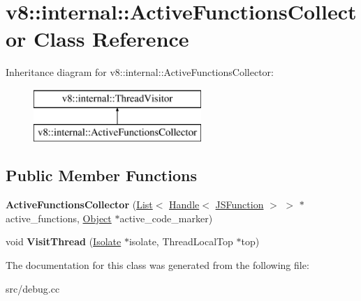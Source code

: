 \hypertarget{classv8_1_1internal_1_1_active_functions_collector}{}\section{v8\+:\+:internal\+:\+:Active\+Functions\+Collector Class Reference}
\label{classv8_1_1internal_1_1_active_functions_collector}
Inheritance diagram for v8\+:\+:internal\+:\+:Active\+Functions\+Collector\+:\begin{figure}[H]
\begin{center}
\leavevmode
\includegraphics[height=2.000000cm]{classv8_1_1internal_1_1_active_functions_collector}
\end{center}
\end{figure}
\subsection*{Public Member Functions}
\begin{DoxyCompactItemize}
\item 
\hypertarget{classv8_1_1internal_1_1_active_functions_collector_a331bc8ac57fd311da9df7ac111166fb7}{}{\bfseries Active\+Functions\+Collector} (\hyperlink{classv8_1_1internal_1_1_list}{List}$<$ \hyperlink{classv8_1_1internal_1_1_handle}{Handle}$<$ \hyperlink{classv8_1_1internal_1_1_j_s_function}{J\+S\+Function} $>$ $>$ $\ast$active\+\_\+functions, \hyperlink{classv8_1_1internal_1_1_object}{Object} $\ast$active\+\_\+code\+\_\+marker)\label{classv8_1_1internal_1_1_active_functions_collector_a331bc8ac57fd311da9df7ac111166fb7}

\item 
\hypertarget{classv8_1_1internal_1_1_active_functions_collector_ab963c00d3974baab41b31cf969da76a7}{}void {\bfseries Visit\+Thread} (\hyperlink{classv8_1_1internal_1_1_isolate}{Isolate} $\ast$isolate, Thread\+Local\+Top $\ast$top)\label{classv8_1_1internal_1_1_active_functions_collector_ab963c00d3974baab41b31cf969da76a7}

\end{DoxyCompactItemize}


The documentation for this class was generated from the following file\+:\begin{DoxyCompactItemize}
\item 
src/debug.\+cc\end{DoxyCompactItemize}

